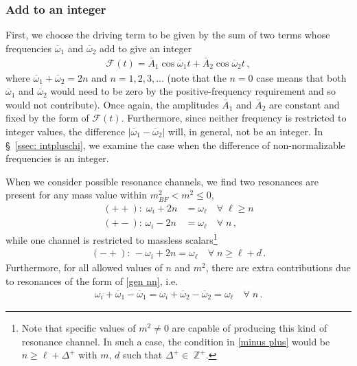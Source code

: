 \documentclass[letterpaper,11pt]{article}
\newcommand{\oi}{\omega_i}
\newcommand{\ol}{\omega_\ell}
\newcommand{\oone}{\overline{\omega}_1}
\newcommand{\otwo}{\overline{\omega}_2}
\newcommand{\mc}{\mathcal}
\begin{document}

\subsubsection{Add to an integer}
\label{ssec: add to integer}

First, we choose the driving term to be given by the sum of two terms whose frequencies $\oone$ and $\otwo$ add to give an integer
\begin{align}
	\mc F(t) = \bar A_1 \cos \oone t + \bar A_2 \cos \otwo t \, ,
\end{align}
where $\oone+ \otwo = 2n$ and $n = 1, 2, 3, \ldots$ (note that the $n = 0$ case means that both $\oone$ and $\otwo$ would need to be zero by the positive-frequency requirement and so would not contribute). Once again, the amplitudes $\bar A_1$ and $\bar A_2$ are constant and fixed by the form of $\mc F(t)$. Furthermore, since neither frequency is restricted to integer values, the difference $|\oone - \otwo|$ will, in general, not be an integer. In \S\!~\ref{ssec: intpluschi}, we examine the case when the difference of non-normalizable frequencies is an integer.

When we consider possible resonance channels, we find two resonances are present for any mass value within $m^2_{BF} < m^2 \leq 0$,
\begin{align}
\label{all pluses}
(++): \; \omega_i + 2n &= \omega_\ell \quad \forall \; \ell \geq n \\
(+-): \, \omega_i - 2n &=\omega_\ell \quad \forall \; n \, ,
\end{align}
while one channel is restricted to massless scalars\footnote{Note that specific values of $m^2 \neq 0$ are capable of producing this kind of resonance channel. In such a case, the condition in \eqref{minus plus} would be $n \geq \ell + \Delta^+$ with $m$, $d$ such that $\Delta^+ \in \; \mathbb{Z}^+$.}
\begin{align}
\label{minus plus}
(-+): \, -\omega_i + 2n = \omega_\ell \quad \forall \; n \geq \ell + d \, .
\end{align}
Furthermore, for all allowed values of $n$ and $m^2$, there are extra contributions due to resonances of the form of \eqref{gen nn}, i.e.
\begin{align}
\label{atoi plus/minus}
	\omega_i + \oone - \oone = \oi + \otwo - \otwo = \ol \quad \forall \; n \, .
\end{align}
\end{document}
